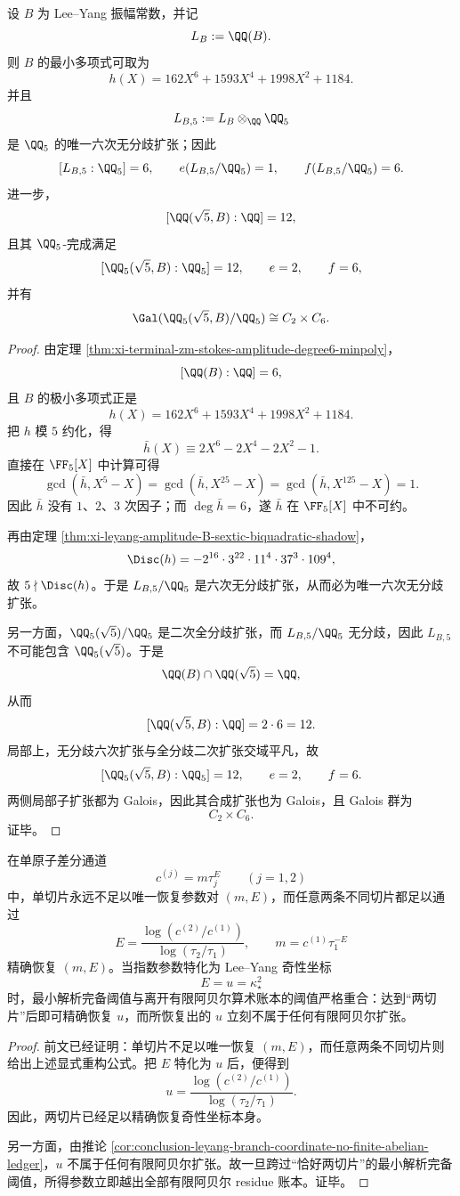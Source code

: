 \begin{theorem}\label{thm:conclusion-leyang-global-local-amplitude-b-q5-lift}
设 \(B\) 为 Lee--Yang 振幅常数，并记
\[
L_B:=\QQ(B).
\]
则 \(B\) 的最小多项式可取为
\[
h(X)=162X^6+1593X^4+1998X^2+1184.
\]
并且
\[
L_{B,5}:=L_B\otimes_{\QQ}\QQ_5
\]
是 \(\QQ_5\) 的唯一六次无分歧扩张；因此
\[
[L_{B,5}:\QQ_5]=6,
\qquad
e(L_{B,5}/\QQ_5)=1,
\qquad
f(L_{B,5}/\QQ_5)=6.
\]
进一步，
\[
[\QQ(\sqrt5,B):\QQ]=12,
\]
且其 \(\QQ_5\)-完成满足
\[
[\QQ_5(\sqrt5,B):\QQ_5]=12,
\qquad
e=2,
\qquad
f=6,
\]
并有
\[
\Gal(\QQ_5(\sqrt5,B)/\QQ_5)\cong C_2\times C_6.
\]
\end{theorem}
\begin{proof}
由定理 \ref{thm:xi-terminal-zm-stokes-amplitude-degree6-minpoly}，
\[
[\QQ(B):\QQ]=6,
\]
且 \(B\) 的极小多项式正是
\[
h(X)=162X^6+1593X^4+1998X^2+1184.
\]
把 \(h\) 模 \(5\) 约化，得
\[
\bar h(X)\equiv 2X^6-2X^4-2X^2-1.
\]
直接在 \(\FF_5[X]\) 中计算可得
\[
\gcd(\bar h,X^5-X)=\gcd(\bar h,X^{25}-X)=\gcd(\bar h,X^{125}-X)=1.
\]
因此 \(\bar h\) 没有 \(1\)、\(2\)、\(3\) 次因子；而 \(\deg \bar h=6\)，遂 \(\bar h\) 在 \(\FF_5[X]\) 中不可约。

再由定理 \ref{thm:xi-leyang-amplitude-B-sextic-biquadratic-shadow}，
\[
\Disc(h)=-2^{16}\cdot 3^{22}\cdot 11^4\cdot 37^3\cdot 109^4,
\]
故 \(5\nmid \Disc(h)\)。于是 \(L_{B,5}/\QQ_5\) 是六次无分歧扩张，从而必为唯一六次无分歧扩张。

另一方面，\(\QQ_5(\sqrt5)/\QQ_5\) 是二次全分歧扩张，而 \(L_{B,5}/\QQ_5\) 无分歧，因此 \(L_{B,5}\) 不可能包含 \(\QQ_5(\sqrt5)\)。于是
\[
\QQ(B)\cap \QQ(\sqrt5)=\QQ,
\]
从而
\[
[\QQ(\sqrt5,B):\QQ]=2\cdot 6=12.
\]
局部上，无分歧六次扩张与全分歧二次扩张交域平凡，故
\[
[\QQ_5(\sqrt5,B):\QQ_5]=12,
\qquad
e=2,
\qquad
f=6.
\]
两侧局部子扩张都为 Galois，因此其合成扩张也为 Galois，且 Galois 群为
\[
C_2\times C_6.
\]
证毕。
\end{proof}

\begin{theorem}[两切片最小完备阈值与离开有限阿贝尔算术账本的阈值重合]\label{thm:conclusion-leyang-global-local-two-slice-threshold}
在单原子差分通道
\[
c^{(j)}=m\tau_j^E
\qquad (j=1,2)
\]
中，单切片永远不足以唯一恢复参数对 \((m,E)\)，而任意两条不同切片都足以通过
\[
E=\frac{\log(c^{(2)}/c^{(1)})}{\log(\tau_2/\tau_1)},
\qquad
m=c^{(1)}\tau_1^{-E}
\]
精确恢复 \((m,E)\)。当指数参数特化为 Lee--Yang 奇性坐标
\[
E=u=\kappa_\star^2
\]
时，最小解析完备阈值与离开有限阿贝尔算术账本的阈值严格重合：达到“两切片”后即可精确恢复 \(u\)，而所恢复出的 \(u\) 立刻不属于任何有限阿贝尔扩张。
\end{theorem}
\begin{proof}
前文已经证明：单切片不足以唯一恢复 \((m,E)\)，而任意两条不同切片则给出上述显式重构公式。把 \(E\) 特化为 \(u\) 后，便得到
\[
u=\frac{\log(c^{(2)}/c^{(1)})}{\log(\tau_2/\tau_1)}.
\]
因此，两切片已经足以精确恢复奇性坐标本身。

另一方面，由推论 \ref{cor:conclusion-leyang-branch-coordinate-no-finite-abelian-ledger}，\(u\) 不属于任何有限阿贝尔扩张。故一旦跨过“恰好两切片”的最小解析完备阈值，所得参数立即越出全部有限阿贝尔 residue 账本。证毕。
\end{proof}
